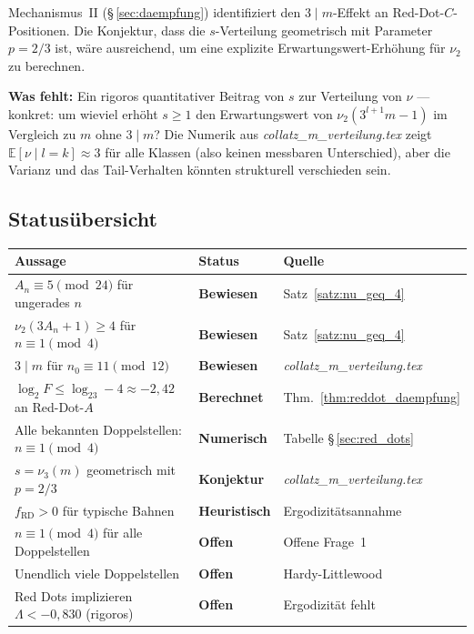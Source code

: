 \documentclass[12pt,a4paper]{article}
\newcommand{\vii}{\nu_2}
\newcommand{\viii}{\nu_3}
\newcommand{\E}{\mathbb{E}}
\newcommand{\logt}{\log_2}
\begin{document}
\begin{tcolorbox}[lücke, title={Offene Frage 4: Gibt das $C$-Komponenten-Argument eine quantitative Schranke?}]
Mechanismus~II (§\,\ref{sec:daempfung}) identifiziert den $3 \mid m$-Effekt
an Red-Dot-$C$-Positionen. Die Konjektur, dass die $s$-Verteilung geometrisch
mit Parameter $p=2/3$ ist, wäre ausreichend, um eine explizite Erwartungswert-Erhöhung
für $\vii$ zu berechnen.

\medskip
\textbf{Was fehlt:}
Ein rigoros quantitativer Beitrag von $s$ zur Verteilung von $\nu$ ---
konkret: um wieviel erhöht $s \geq 1$ den Erwartungswert von
$\vii(3^{l+1}m - 1)$ im Vergleich zu $m$ ohne $3 \mid m$?
Die Numerik aus \textit{collatz\_m\_verteilung.tex} zeigt
$\E[\nu \mid l=k] \approx 3$ für alle Klassen (also keinen messbaren Unterschied),
aber die Varianz und das Tail-Verhalten könnten strukturell verschieden sein.
\end{tcolorbox}

\subsection{Statusübersicht}

\begin{center}
\renewcommand{\arraystretch}{1.5}
\begin{tabular}{p{6.5cm} p{2.5cm} p{4cm}}
\toprule
\textbf{Aussage} & \textbf{Status} & \textbf{Quelle} \\
\midrule
$A_n \equiv 5 \pmod{24}$ für ungerades $n$
  & \textcolor{bewiesengrün}{\bfseries Bewiesen}
  & Satz~\ref{satz:nu_geq_4} \\
$\vii(3A_n+1) \geq 4$ für $n \equiv 1 \pmod 4$
  & \textcolor{bewiesengrün}{\bfseries Bewiesen}
  & Satz~\ref{satz:nu_geq_4} \\
$3 \mid m$ für $n_0 \equiv 11 \pmod{12}$
  & \textcolor{bewiesengrün}{\bfseries Bewiesen}
  & \textit{collatz\_m\_verteilung.tex} \\
$\logt F \leq \logt 3 - 4 \approx -2{,}42$ an Red-Dot-$A$
  & \textcolor{bewiesengrün}{\bfseries Berechnet}
  & Thm.~\ref{thm:reddot_daempfung} \\
\midrule
Alle bekannten Doppelstellen: $n \equiv 1 \pmod{4}$
  & \textcolor{warnorange}{\bfseries Numerisch}
  & Tabelle §\,\ref{sec:red_dots} \\
$s = \viii(m)$ geometrisch mit $p=2/3$
  & \textcolor{warnorange}{\bfseries Konjektur}
  & \textit{collatz\_m\_verteilung.tex} \\
$f_{\mathrm{RD}} > 0$ für typische Bahnen
  & \textcolor{warnorange}{\bfseries Heuristisch}
  & Ergodizitätsannahme \\
\midrule
$n \equiv 1 \pmod 4$ für alle Doppelstellen
  & \textcolor{lückenrot}{\bfseries Offen}
  & Offene Frage~1 \\
Unendlich viele Doppelstellen
  & \textcolor{lückenrot}{\bfseries Offen}
  & Hardy-Littlewood \\
Red Dots implizieren $\Lambda < -0{,}830$ (rigoros)
  & \textcolor{lückenrot}{\bfseries Offen}
  & Ergodizität fehlt \\
\bottomrule
\end{tabular}
\end{center}
\end{document}
